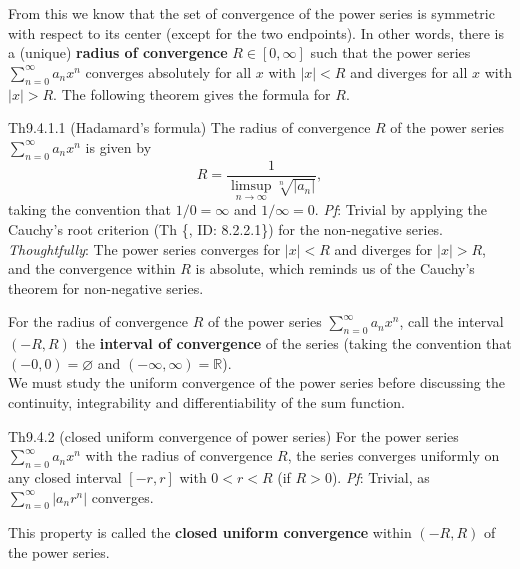 \documentclass{article}
\begin{document}
\begin{Rmk}{}
    From this we know that the set of convergence of the power series is symmetric with respect to its center (except for the two endpoints). In other words, \textcolor{Th}{there is a (unique)} \textcolor{Df}{\textbf{radius of convergence} $R\in [0, \infty]$} \textcolor{Th}{such that the power series $\sum_{n=0}^{\infty} a_n x^n$ converges absolutely for all $x$ with $|x| < R$ and diverges for all $x$ with $|x| > R$.} The following theorem gives the formula for $R$.
\end{Rmk}

\begin{Th}{Th9.4.1.1 (Hadamard's formula)}
    The radius of convergence $R$ of the power series $\sum_{n=0}^{\infty} a_n x^n$ is given by
    $$ R = \frac{1}{\limsup\limits_{n\to\infty} \sqrt[n]{|a_n|}}, $$
    taking the convention that $1/0 = \infty$ and $1/\infty = 0$.
    \tcblower
    \textit{Pf}: Trivial by applying the Cauchy's root criterion (Th \{, ID: 8.2.2.1\}) for the non-negative series. \\
    \textcolor{P}{\textit{Thoughtfully}: The power series converges for $|x| < R$ and diverges for $|x| > R$, and the convergence within $R$ is absolute, which reminds us of the Cauchy's theorem for non-negative series.}
\end{Th}

\begin{Rmk}{}
    \textcolor{Df}{For the radius of convergence $R$ of the power series $\sum_{n=0}^{\infty} a_n x^n$, call the interval $(-R, R)$ the \textbf{interval of convergence} of the series (taking the convention that $(-0, 0) = \varnothing$ and $(-\infty, \infty) = \mathbb{R}$).} \\
    We must study the uniform convergence of the power series before discussing the continuity, integrability and differentiability of the sum function.
\end{Rmk}

\begin{Th}{Th9.4.2 (closed uniform convergence of power series)}
    For the power series $\sum_{n=0}^{\infty} a_n x^n$ with the radius of convergence $R$, the series converges uniformly on any closed interval $[-r, r]$ with $0 < r < R$ (if $R>0$).
    \tcblower
    \textit{Pf}: Trivial, as $\sum_{n=0}^{\infty} |a_n r^n|$ converges.
\end{Th}

\begin{Rmk}{}
    \textcolor{Df}{This property is called the \textbf{closed uniform convergence} within $(-R, R)$ of the power series.} 
\end{Rmk}
\end{document}
